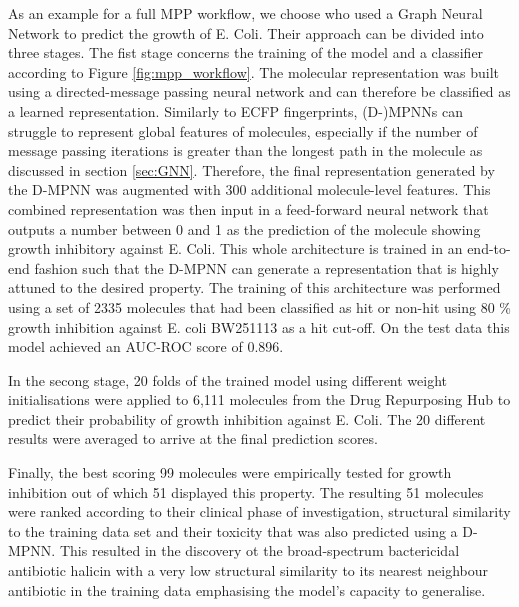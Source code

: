 As an example for a full MPP workflow, we choose \cite{STOKES2020688} who used a Graph Neural Network to predict the growth of E. Coli. Their approach can be divided into three stages. The fist stage concerns the training of the model and a classifier according to Figure \ref{fig:mpp_workflow}. The molecular representation was built using a directed-message passing neural network \cite{yangMPP} and can therefore be classified as a learned representation. Similarly to ECFP fingerprints, (D-)MPNNs can struggle to represent global features of molecules, especially if the number of message passing iterations is greater than the longest path in the molecule as discussed in section \ref{sec:GNN}. Therefore, the final representation generated by the D-MPNN was augmented with 300 additional molecule-level features. This combined representation was then input in a feed-forward neural network that outputs a number between 0 and 1 as the prediction of the molecule showing growth inhibitory against E. Coli. This whole architecture is trained in an end-to-end fashion such that the D-MPNN can generate a representation that is highly attuned to the desired property.
The training of this architecture was performed using a set of 2335 molecules that had been classified as hit or non-hit using 80 \% growth inhibition against E. coli BW251113 \cite{ZAMPIERI20171214} as a hit cut-off. On the test data this model achieved an AUC-ROC score of 0.896.

In the secong stage, 20 folds of the trained model using different weight initialisations were applied to 6,111 molecules from the Drug Repurposing Hub \citep{corsello} to predict their probability of growth inhibition against E. Coli. The 20 different results were averaged to arrive at the final prediction scores. 

Finally, the best scoring 99 molecules were empirically tested for growth inhibition out of which 51 displayed this property. The resulting 51 molecules were ranked according to their clinical phase of investigation, structural similarity to the training data set and their toxicity that was also predicted using a D-MPNN. This resulted in the discovery ot the broad-spectrum bactericidal antibiotic halicin with a very low structural similarity to its nearest neighbour antibiotic in the training data emphasising the model's capacity to generalise. 

